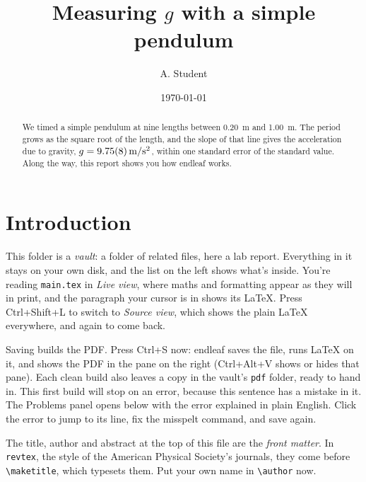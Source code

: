 \documentclass[reprint,aps,pra]{revtex4-2} %
\begin{document}
\title{Measuring $g$ with a simple pendulum}
\author{A. Student}
\date{\today}

\begin{abstract}
We timed a simple pendulum at nine lengths between \qty{0.20}{m} and \qty{1.00}{m}. The period grows as the square root of the length, and the slope of that line gives the acceleration due to gravity, $g = \qty{9.75 \pm 0.08}{m/s^2}$, within one standard error of the standard value. Along the way, this report shows you how endleaf works.
\end{abstract}

\maketitle

\section{Introduction}

This folder is a \emph{vault}: a folder of related files, here a lab report. Everything in it stays on your own disk, and the list on the left shows what's inside. You're reading \texttt{main.tex} in \emph{Live view}, where maths and formatting appear as they will in print, and the paragraph your cursor is in shows its LaTeX. Press Ctrl+Shift+L to switch to \emph{Source view}, which shows the plain LaTeX everywhere, and again to come back.

Saving builds the PDF. Press Ctrl+S now: endleaf saves the file, runs LaTeX on it, and shows the PDF in the pane on the right (Ctrl+Alt+V shows or hides that pane). Each clean build also leaves a copy in the vault's \texttt{pdf} folder, ready to hand in. This first build will stop on an error, because this sentence has a  mistake in it. The Problems panel opens below with the error explained in plain English. Click the error to jump to its line, fix the misspelt command, and save again.

The title, author and abstract at the top of this file are the \emph{front matter}. In \texttt{revtex}, the style of the American Physical Society's journals, they come before \verb|\maketitle|, which typesets them. Put your own name in \verb|\author| now.
\end{document}
